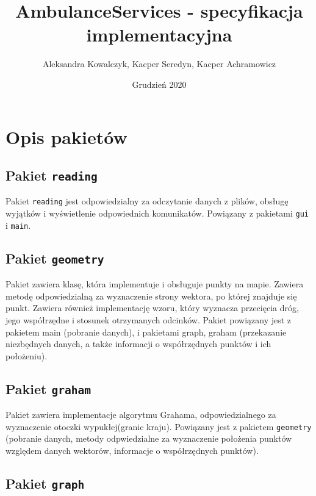 \documentclass{article}
\begin{document}
\title{AmbulanceServices - specyfikacja implementacyjna}
\author{Aleksandra Kowalczyk, Kacper Seredyn, Kacper Achramowicz}
\date{Grudzień 2020}
\maketitle 
\thispagestyle{fancy}
\renewcommand*\contentsname{Spis treści}


\setcounter{tocdepth}{2}
\tableofcontents

\pagebreak

\section{Opis pakietów}
\subsection{ Pakiet \texttt{reading}}

Pakiet \texttt{reading} jest odpowiedzialny za odczytanie danych z plików, obsługę wyjątków i wyświetlenie odpowiednich komunikatów. Powiązany z pakietami \texttt{gui} i \texttt{main}.

\subsection{ Pakiet \texttt{geometry}}

Pakiet zawiera klasę, która implementuje i obsługuje punkty na mapie. Zawiera metodę odpowiedzialną za wyznaczenie strony wektora, po której znajduje się punkt. Zawiera również implementację wzoru, który wyznacza przecięcia dróg, jego współrzędne i stosunek otrzymanych odcinków.
Pakiet powiązany jest z pakietem main (pobranie danych), i pakietami graph, graham (przekazanie niezbędnych danych, a także informacji o współrzędnych punktów i ich położeniu).
\subsection{Pakiet \texttt{graham}}

Pakiet zawiera implementacje algorytmu Grahama, odpowiedzialnego za wyznaczenie otoczki wypukłej(granic kraju).
Powiązany jest z pakietem  \texttt{geometry} (pobranie danych, metody odpwiedzialne za wyznaczenie położenia punktów względem danych wektorów, informacje o współrzędnych punktów).

\subsection{Pakiet \texttt{graph}}
\end{document}
